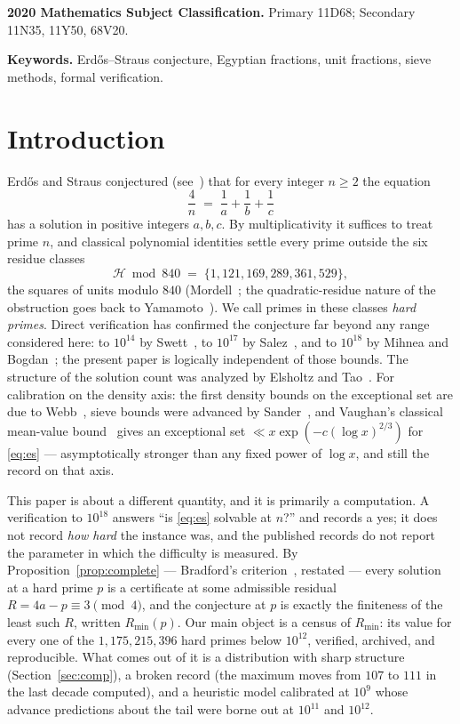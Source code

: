 \documentclass[11pt]{article}
\theoremstyle{plain}
\theoremstyle{remark}
\theoremstyle{plain}
\numberwithin{equation}{section}
\newcommand{\Hset}{\mathcal{H}}
\begin{document}
\medskip
\noindent\textbf{2020 Mathematics Subject Classification.}
Primary 11D68; Secondary 11N35, 11Y50, 68V20.

\smallskip
\noindent\textbf{Keywords.} Erd\H{o}s--Straus conjecture, Egyptian
fractions, unit fractions, sieve methods, formal verification.

\section{Introduction}

Erd\H{o}s and Straus conjectured (see~\cite{Erdos50}) that for every
integer $n \ge 2$ the equation
\begin{equation}\label{eq:es}
  \frac{4}{n} \;=\; \frac{1}{a} + \frac{1}{b} + \frac{1}{c}
\end{equation}
has a solution in positive integers $a, b, c$. By multiplicativity it
suffices to treat prime $n$, and classical polynomial identities settle
every prime outside the six residue classes
\[
  \Hset \bmod 840 \;=\; \{1, 121, 169, 289, 361, 529\},
\]
the squares of units modulo $840$ (Mordell~\cite[Ch.~30]{Mordell}; the
quadratic-residue nature of the obstruction goes back to
Yamamoto~\cite{Yamamoto}). We call primes
in these classes \emph{hard primes}. Direct verification has confirmed the
conjecture far beyond any range considered here: to $10^{14}$ by Swett~\cite{Swett}, to $10^{17}$ by Salez~\cite{Salez}, and to $10^{18}$ by
Mihnea and Bogdan~\cite{MihneaBogdan}; the present paper is logically
independent of those bounds. The structure of
the solution count was analyzed by Elsholtz and Tao~\cite{ElsholtzTao}.
For calibration on the density axis: the first
density bounds on the exceptional set are due to Webb~\cite{Webb},
sieve bounds were advanced by Sander~\cite{Sander}, and
Vaughan's classical
mean-value bound~\cite{Vaughan} gives an exceptional set
$\ll x \exp(-c(\log x)^{2/3})$ for \eqref{eq:es} --- asymptotically
stronger than any fixed power of $\log x$, and still the record on
that axis.

This paper is about a different quantity, and it is primarily a
computation. A verification to $10^{18}$ answers ``is
\eqref{eq:es} solvable at $n$?'' and records a yes; it does not
record \emph{how hard} the instance was, and the published records do
not report the parameter in which the difficulty is measured. By
Proposition~\ref{prop:complete} --- Bradford's
criterion~\cite{Bradford}, restated --- every solution at a hard
prime $p$ is a certificate at some admissible residual
$R = 4a - p \equiv 3 \pmod 4$, and the conjecture at $p$ is exactly
the finiteness of the least such $R$, written $R_{\min}(p)$. Our
main object is a census of $R_{\min}$: its value for every one of the
$1{,}175{,}215{,}396$ hard primes below $10^{12}$, verified,
archived, and reproducible. What comes out of it is a distribution
with sharp structure (Section~\ref{sec:comp}), a broken record
(the maximum moves from $107$ to $111$ in the last decade computed),
and a heuristic model calibrated at $10^9$ whose advance predictions
about the tail were borne out at $10^{11}$ and $10^{12}$.
\end{document}
